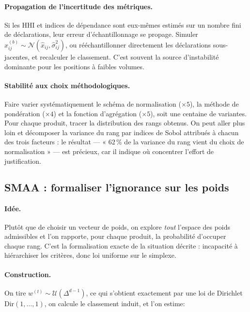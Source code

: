 \documentclass[11pt,a4paper]{article}
\theoremstyle{definition}
\theoremstyle{remark}
\newcommand{\Unif}{\mathcal{U}}
\newcommand{\simplex}{\Delta^{d-1}}
\begin{document}
\paragraph{Propagation de l'incertitude des métriques.} Si les HHI et indices de dépendance sont
eux-mêmes estimés sur un nombre fini de déclarations, leur erreur d'échantillonnage se propage.
Simuler $x_{ij}^{(b)} \sim \mathcal{N}(\hat{x}_{ij}, \hat{\sigma}^2_{ij})$, ou rééchantillonner
directement les déclarations sous-jacentes, et recalculer le classement. C'est souvent la source
d'instabilité dominante pour les positions à faibles volumes.

\medskip

\paragraph{Stabilité aux choix méthodologiques.} Faire varier systématiquement le schéma de
normalisation ($\times 5$), la méthode de pondération ($\times 4$) et la fonction d'agrégation
($\times 5$), soit une centaine de variantes. Pour chaque produit, tracer la distribution des
rangs obtenus. On peut aller plus loin et décomposer la variance du rang par indices de Sobol
attribués à chacun des trois facteurs : le résultat --- « $62\,\%$ de la variance du rang vient du
choix de normalisation » --- est précieux, car il indique où concentrer l'effort de justification.

\bigskip

\subsection{SMAA : formaliser l'ignorance sur les poids}
\label{sec:smaa}

\medskip

\paragraph{Idée.} Plutôt que de choisir un vecteur de poids, on explore \emph{tout} l'espace des
poids admissibles et l'on rapporte, pour chaque produit, la probabilité d'occuper chaque rang.
C'est la formalisation exacte de la situation décrite : incapacité à hiérarchiser les critères,
donc loi uniforme sur le simplexe.

\medskip

\paragraph{Construction.} On tire $w^{(t)} \sim \Unif(\simplex)$, ce qui s'obtient exactement par
une loi de Dirichlet $\mathrm{Dir}(1,\dots,1)$, on calcule le classement induit, et l'on estime:
\end{document}
